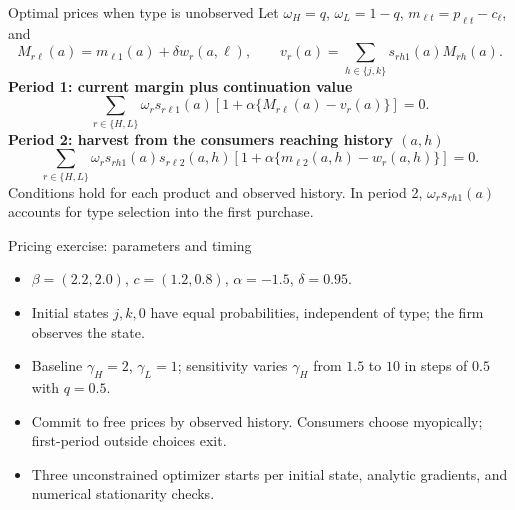 \documentclass[aspectratio=169,11pt]{beamer}
\begin{document}
\appendix
{}

\begin{frame}[noframenumbering,label=unobserved-price-conditions]{Optimal prices when type is unobserved}
\small\setlength{\parskip}{3pt}
Let $\omega_H=q$, $\omega_L=1-q$, $m_{\ell t}=p_{\ell t}-c_\ell$, and
\[
M_{r\ell}(a)=m_{\ell1}(a)+\delta w_r(a,\ell),\qquad
v_r(a)=\sum_{h\in\{j,k\}}s_{rh1}(a)M_{rh}(a).
\]
\textbf{Period 1: current margin plus continuation value}
\[
\sum_{r\in\{H,L\}}\omega_r s_{r\ell1}(a)
\left[1+\alpha\{M_{r\ell}(a)-v_r(a)\}\right]=0.
\]
\textbf{Period 2: harvest from the consumers reaching history $(a,h)$}
\[
\sum_{r\in\{H,L\}}\omega_r s_{rh1}(a)s_{r\ell2}(a,h)
\left[1+\alpha\{m_{\ell2}(a,h)-w_r(a,h)\}\right]=0.
\]
\footnotesize Conditions hold for each product and observed history. In period 2, $\omega_rs_{rh1}(a)$ accounts for type selection into the first purchase.
\par\medskip\hyperlink{optimal-price-conditions}{}
\end{frame}

\begin{frame}[noframenumbering,label=supply-parameters]{Pricing exercise: parameters and timing}
\begin{itemize}
\item $\beta=(2.2,2.0)$, $c=(1.2,0.8)$, $\alpha=-1.5$, $\delta=0.95$.
\item Initial states $j,k,0$ have equal probabilities, independent of type; the firm observes the state.
\item Baseline $\gamma_H=2$, $\gamma_L=1$; sensitivity varies $\gamma_H$ from $1.5$ to $10$ in steps of $0.5$ with $q=0.5$.
\item Commit to free prices by observed history. Consumers choose myopically; first-period outside choices exit.
\item Three unconstrained optimizer starts per initial state, analytic gradients, and numerical stationarity checks.
\end{itemize}
\hyperlink{supply-results}{}
\end{frame}
\end{document}

